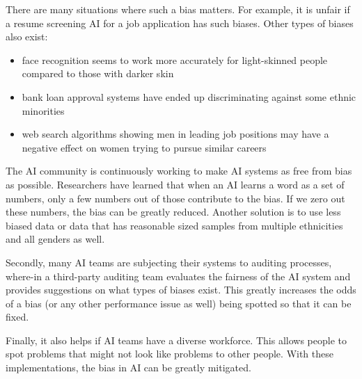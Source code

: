 \documentclass{article}[a4paper,12pt]
\theoremstyle{definition}
\begin{document}
There are many situations where such a bias matters. For example, it is unfair if a resume screening AI for a job application has such biases. Other types of biases also exist:
\begin{itemize}
	\item face recognition seems to work more accurately for light-skinned people compared to those with darker skin
	\item bank loan approval systems have ended up discriminating against some ethnic minorities
	\item web search algorithms showing men in leading job positions may have a negative effect on women trying to pursue similar careers
\end{itemize}
The AI community is continuously working to make AI systems as free from bias as possible. Researchers have learned that when an AI learns a word as a set of numbers, only a few numbers out of those contribute to the bias. If we zero out these numbers, the bias can be greatly reduced. Another solution is to use less biased data or data that has reasonable sized samples from multiple ethnicities and all genders as well.
\vspace{6pt}

Secondly, many AI teams are subjecting their systems to auditing processes, where-in a third-party auditing team evaluates the fairness of the AI system and provides suggestions on what types of biases exist. This greatly increases the odds of a bias (or any other performance issue as well) being spotted so that it can be fixed.
\vspace{6pt}

Finally, it also helps if AI teams have a diverse workforce. This allows people to spot problems that might not look like problems to other people. With these implementations, the bias in AI can be greatly mitigated.
\end{document}
